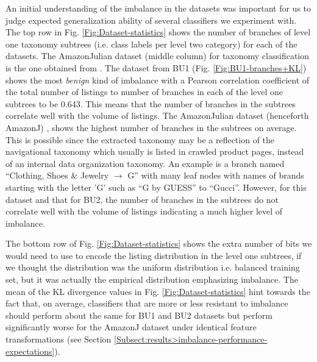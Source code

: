 An initial understanding of the imbalance in the datasets was important for us to judge expected generalization ability of several classifiers we experiment with. 
The top row in Fig. \ref{Fig:Dataset-statistics} shows the number of branches of level one taxonomy subtrees (i.e. class labels per level two category) for each of the datasets.
The AmazonJulian dataset (middle column) for taxonomy classification is the one obtained from \cite{Julian15}.
The dataset from BU1 (Fig. \ref{Fig:BU1-branches+KL}) shows the most \textit{benign} kind of imbalance with a Pearson correlation coefficient of the total number of listings to number of branches in each of the level one subtrees to be 0.643.
This means that the number of branches in the subtrees correlate well with the volume of listings.
The AmazonJulian dataset (henceforth AmazonJ) \cite{Julian15}, shows the highest number of branches in the subtrees on average.
This is possible since the extracted taxonomy may be a reflection of the navigational taxonomy which usually is listed in crawled product pages, instead of an internal data organization taxonomy.
An example is a branch named ``Clothing, Shoes \& Jewelry $\rightarrow$ G'' with many leaf nodes with names of brands starting with the letter 'G' such as ``G by GUESS'' to ``Gucci''.
However, for this dataset and that for BU2, the number of branches in the subtrees do not correlate well with the volume of listings indicating a much higher level of imbalance.

The bottom row of Fig. \ref{Fig:Dataset-statistics} shows the extra number of bits we would need to use to encode the listing distribution in the level one subtrees, if we thought the distribution was the uniform distribution i.e. balanced training set, but it was actually the empirical distribution emphasizing imbalance.
The mean of the KL divergence values in Fig. \ref{Fig:Dataset-statistics} hint towards the fact that, on average, classifiers that are more or less resistant to imbalance should perform about the same for BU1 and BU2 datasets but perform significantly worse for the AmazonJ dataset under identical feature transformations (see Section \ref{Subsect:results>imbalance-performance-expectations}).
